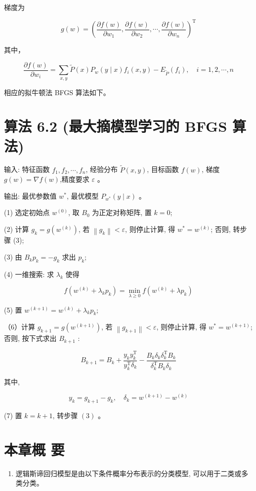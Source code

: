 \documentclass[10pt]{article}
\begin{document}
\begin{CJK*}{UTF8}{bsmi}
梯度为

$$
g(w)=\left(\frac{\partial f(w)}{\partial w_{1}}, \frac{\partial f(w)}{\partial w_{2}}, \cdots, \frac{\partial f(w)}{\partial w_{n}}\right)^{\mathrm{T}}
$$

其中，

$$
\frac{\partial f(w)}{\partial w_{i}}=\sum_{x, y} \tilde{P}(x) P_{w}(y \mid x) f_{i}(x, y)-E_{\tilde{P}}\left(f_{i}\right), \quad i=1,2, \cdots, n
$$

相应的拟牛顿法 BFGS 算法如下。

\section*{算法 6.2 (最大摘模型学习的 BFGS 算法)}
输入: 特征函数 $f_{1}, f_{2}, \cdots, f_{n}$, 经验分布 $\tilde{P}(x, y)$, 目标函数 $f(w)$, 梯度 $g(w)=\nabla f(w)$,精度要求 $\varepsilon$ 。

输出: 最优参数值 $w^{*}$, 最优模型 $P_{w^{*}}(y \mid x)$ 。

(1) 选定初始点 $w^{(0)}$, 取 $B_{0}$ 为正定对称矩阵, 置 $k=0$;

(2) 计算 $g_{k}=g\left(w^{(k)}\right)$, 若 $\left\|g_{k}\right\|<\varepsilon$, 则停止计算, 得 $w^{*}=w^{(k)}$; 否则, 转步骤 (3);

(3) 由 $B_{k} p_{k}=-g_{k}$ 求出 $p_{k}$;

(4) 一维搜索: 求 $\lambda_{k}$ 使得

$$
f\left(w^{(k)}+\lambda_{k} p_{k}\right)=\min _{\lambda \geqslant 0} f\left(w^{(k)}+\lambda p_{k}\right)
$$

(5) 置 $w^{(k+1)}=w^{(k)}+\lambda_{k} p_{k}$;

（6）计算 $g_{k+1}=g\left(w^{(k+1)}\right)$, 若 $\left\|g_{k+1}\right\|<\varepsilon$, 则停止计算, 得 $w^{*}=w^{(k+1)}$; 否则, 按下式求出 $B_{k+1}$ :

$$
B_{k+1}=B_{k}+\frac{y_{k} y_{k}^{\mathrm{T}}}{y_{k}^{\mathrm{T}} \delta_{k}}-\frac{B_{k} \delta_{k} \delta_{k}^{\mathrm{T}} B_{k}}{\delta_{k}^{\mathrm{T}} B_{k} \delta_{k}}
$$

其中,

$$
y_{k}=g_{k+1}-g_{k}, \quad \delta_{k}=w^{(k+1)}-w^{(k)}
$$

(7) 置 $k=k+1$, 转步骤 $(3)$ 。

\section*{本章概 要}
\begin{enumerate}
  \item 逻辑斯谛回归模型是由以下条件概率分布表示的分类模型, 可以用于二类或多类分类。
\end{enumerate}


\end{CJK*}
\end{document}
